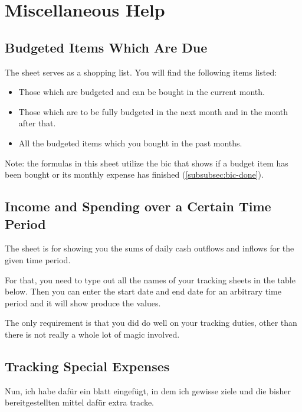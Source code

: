 \section{Miscellaneous Help}
\label{sec:miscellaneous-help}

\subsection{Budgeted Items Which Are Due}
\label{subsec:budgeted-items-which-are-due}

The sheet  serves as a shopping list.
You will find the following items listed:
\begin{itemize}
	\item Those which are budgeted and can be bought in the current month.
	\item Those which are to be fully budgeted in the next month and in the month after that.
	\item All the budgeted items which you bought in the past months.
\end{itemize}

Note: the formulas in this sheet utilize the \ac{bic} that shows if a budget item has been bought or its monthly expense has finished (\autoref{subsubsec:bic-done}).

\subsection{Income and Spending over a Certain Time Period}
\label{subsec:income-and-spending-certain-time-period}

The sheet  is for showing you the sums of daily cash outflows and inflows for the given time period.

For that, you need to type out all the names of your tracking sheets in the table below.
Then you can enter the start date and end date for an arbitrary time period and it will show produce the values.

The only requirement is that you did do well on your tracking duties, other than there is not really a whole lot of magic involved.

\subsection{Tracking Special Expenses}
\label{subsec:tracking-special-expenses}

Nun, ich habe dafür ein blatt eingefügt, in dem ich gewisse ziele und die bisher bereitgestellten mittel dafür extra tracke.


